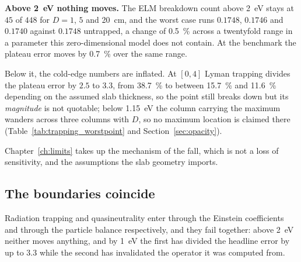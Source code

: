 \textbf{Above \SI{2}{\electronvolt} nothing moves.} The ELM breakdown count
above \SI{2}{\electronvolt} stays at $45$ of $448$ for $D = 1$, $5$ and
\SI{20}{\centi\metre}, and the worst case runs $0.1748$, $0.1746$ and $0.1740$
against $0.1748$ untrapped, a change of \SI{0.5}{\percent} across a twentyfold
range in a parameter this zero-dimensional model does not contain. At the
benchmark the plateau error moves by \SI{0.7}{\percent} over the same range.

Below it, the cold-edge numbers are inflated. At $[0,4]$ Lyman trapping divides
the plateau error by $2.5$ to $3.3$, from \SI{38.7}{\percent} to between
\SI{15.7}{\percent} and \SI{11.6}{\percent} depending on the assumed slab
thickness, so the point still breaks down but its \emph{magnitude} is not
quotable; below \SI{1.15}{\electronvolt} the column carrying the maximum wanders
across three columns with $D$, so no maximum location is claimed there
(Table~\ref{tab:trapping_worstpoint} and Section~\ref{sec:opacity}).

Chapter~\ref{ch:limits} takes up the mechanism of the fall, which is not a loss
of sensitivity, and the assumptions the slab geometry imports.

\subsection{The boundaries coincide}

Radiation trapping and quasineutrality enter through the Einstein coefficients
and through the particle balance respectively, and they fail together: above
\SI{2}{\electronvolt} neither moves anything, and by \SI{1}{\electronvolt} the
first has divided the headline error by up to $3.3$ while the second has
invalidated the operator it was computed from.

